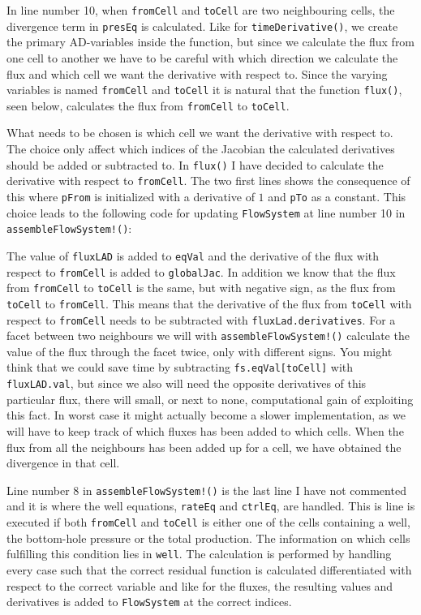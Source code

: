 In line number 10, when \texttt{fromCell} and \texttt{toCell} are two neighbouring cells, the divergence term in \texttt{presEq} is calculated. Like for \texttt{timeDerivative()}, we create the primary AD-variables inside the function, but since we calculate the flux from one cell to another we have to be careful with which direction we calculate the flux and which cell we want the derivative with respect to. Since the varying variables is named \texttt{fromCell} and \texttt{toCell} it is natural that the function \texttt{flux()}, seen below, calculates the flux from \texttt{fromCell} to \texttt{toCell}. 

What needs to be chosen is which cell we want the derivative with respect to. The choice only affect which indices of the Jacobian the calculated derivatives should be added or subtracted to. In \texttt{flux()} I have decided to calculate the derivative with respect to \texttt{fromCell}. The two first lines shows the consequence of this where \texttt{pFrom} is initialized with a derivative of $1$ and \texttt{pTo} as a constant. This choice leads to the following code for updating \texttt{FlowSystem} at line number 10 in \texttt{assembleFlowSystem!()}:

The value of \texttt{fluxLAD} is added to \texttt{eqVal} and the derivative of the flux with respect to \texttt{fromCell} is added to \texttt{globalJac}. In addition we know that the flux from \texttt{fromCell} to \texttt{toCell} is the same, but with negative sign, as the flux from \texttt{toCell} to \texttt{fromCell}. This means that the derivative of the flux from \texttt{toCell} with respect to \texttt{fromCell} needs to be subtracted with \texttt{fluxLad.derivatives}. For a facet between two neighbours we will with \texttt{assembleFlowSystem!()} calculate the value of the flux through the facet twice, only with different signs. You might think that we could save time by subtracting \texttt{fs.eqVal[toCell]} with \texttt{fluxLAD.val}, but since we also will need the opposite derivatives of this particular flux, there will small, or next to none, computational gain of exploiting this fact. In worst case it might actually become a slower implementation, as we will have to keep track of which fluxes has been added to which cells. When the flux from all the neighbours has been added up for a cell, we have obtained the divergence in that cell. 

Line number 8 in \texttt{assembleFlowSystem!()} is the last line I have not commented and it is where the well equations, \texttt{rateEq} and \texttt{ctrlEq}, are handled. This is line is executed if both \texttt{fromCell} and \texttt{toCell} is either one of the cells containing a well, the bottom-hole pressure or the total production. The information on which cells fulfilling this condition lies in \texttt{well}. The calculation is performed by handling every case such that the correct residual function is calculated differentiated with respect to the correct variable and like for the fluxes, the resulting values and derivatives is added to \texttt{FlowSystem} at the correct indices. 

